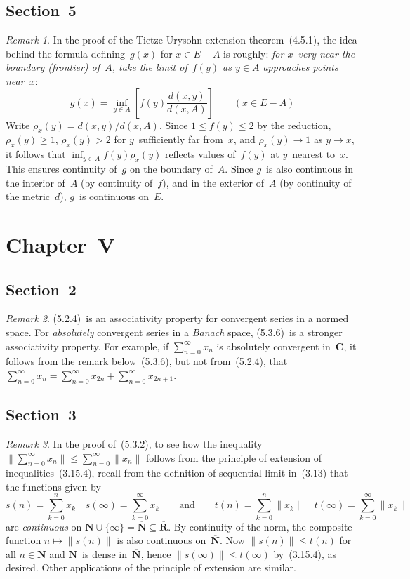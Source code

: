 \documentclass[letterpaper,12pt]{article}
\newcommand{\N}{\mathbf{N}}
\newcommand{\Nex}{\overline{\N}}
\newcommand{\R}{\mathbf{R}}
\newcommand{\Rex}{\overline{\R}}
\newcommand{\C}{\mathbf{C}}
\newcommand{\union}{\cup}
\newcommand{\norm}[1]{\lVert{#1}\rVert}
\theoremstyle{plain}
\theoremstyle{definition}
\theoremstyle{remark}
\newtheorem*{rmk}{Remark}
\begin{document}
\subsection*{Section~5}
\begin{rmk}
In the proof of the Tietze-Urysohn extension theorem~(4.5.1), the idea behind the formula defining~\(g(x)\) for \(x\in E-A\) is roughly: \emph{for \(x\)~very near the boundary (frontier) of~\(A\), take the limit of~\(f(y)\) as \(y\in A\) approaches points near~\(x\)}:
\[g(x)=\inf_{y\in A}\left[f(y)\frac{d(x,y)}{d(x,A)}\right]\qquad(x\in E-A)\]
Write \(\rho_x(y)=d(x,y)/d(x,A)\). Since \(1\le f(y)\le 2\) by the reduction, \(\rho_x(y)\ge 1\), \(\rho_x(y)>2\) for \(y\)~sufficiently far from~\(x\), and \(\rho_x(y)\to 1\) as \(y\to x\), it follows that \(\inf_{y\in A}f(y)\rho_x(y)\) reflects values of~\(f(y)\) at \(y\)~nearest to~\(x\). This ensures continuity of~\(g\) on the boundary of~\(A\). Since \(g\)~is also continuous in the interior of~\(A\) (by continuity of~\(f\)), and in the exterior of~\(A\) (by continuity of the metric~\(d\)), \(g\)~is continuous on~\(E\).
\end{rmk}

\section*{Chapter~V}
\subsection*{Section~2}
\begin{rmk}
(5.2.4)~is an associativity property for convergent series in a normed space. For \emph{absolutely} convergent series in a \emph{Banach} space, (5.3.6)~is a stronger associativity property. For example, if \(\sum_{n=0}^{\infty}x_n\) is absolutely convergent in~\(\C\), it follows from the remark below~(5.3.6), but not from~(5.2.4), that \(\sum_{n=0}^{\infty}x_n=\sum_{n=0}^{\infty}x_{2n}+\sum_{n=0}^{\infty}x_{2n+1}\).
\end{rmk}

\subsection*{Section~3}
\begin{rmk}
In the proof of~(5.3.2), to see how the inequality \(\norm{\sum_{n=0}^{\infty}x_n}\le\sum_{n=0}^{\infty}\norm{x_n}\) follows from the principle of extension of inequalities~(3.15.4), recall from the definition of sequential limit in~(3.13) that the functions given by
\[s(n)=\sum_{k=0}^n x_k\quad s(\infty)=\sum_{k=0}^{\infty}x_k\qquad\text{and}\qquad t(n)=\sum_{k=0}^n\norm{x_k}\quad t(\infty)=\sum_{k=0}^{\infty}\norm{x_k}\]
are \emph{continuous} on \(\N\union\{\infty\}=\Nex\subseteq\Rex\). By continuity of the norm, the composite function \(n\mapsto\norm{s(n)}\) is also continuous on~\(\Nex\). Now \(\norm{s(n)}\le t(n)\) for all \(n\in\N\) and \(\N\)~is dense in~\(\Nex\), hence \(\norm{s(\infty)}\le t(\infty)\) by~(3.15.4), as desired. Other applications of the principle of extension are similar.
\end{rmk}
\end{document}
